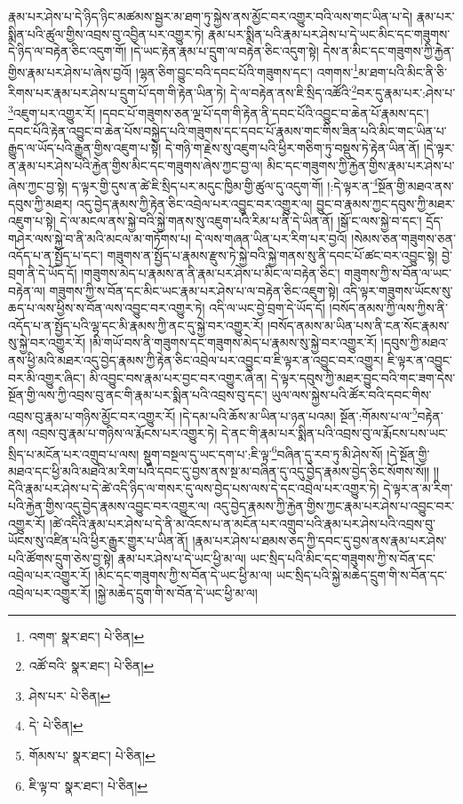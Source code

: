 རྣམ་པར་ཤེས་པ་དེ་ཉིད་ཉིང་མཚམས་སྦྱར་མ་ཐག་ཏུ་སྐྱེས་ནས་མྱོང་བར་འགྱུར་བའི་ལས་གང་ཡིན་པ་དེ། རྣམ་པར་སྨིན་པའི་ཚུལ་གྱིས་འབྲས་བུ་འབྱིན་པར་འགྱུར་ཏེ། རྣམ་པར་སྨིན་པའི་རྣམ་པར་ཤེས་པ་དེ་ཡང་མིང་དང་གཟུགས་དེ་ཉིད་ལ་བརྟེན་ཅིང་འདུག་གོ། །དེ་ཡང་རྟེན་རྣམ་པ་དྲུག་ལ་བརྟེན་ཅིང་འདུག་སྟེ། དེས་ན་མིང་དང་གཟུགས་ཀྱི་རྐྱེན་གྱིས་རྣམ་པར་ཤེས་པ་ཞེས་བྱའོ། །ལྷན་ཅིག་བྱུང་བའི་དབང་པོའི་གཟུགས་དང་། འགགས་\footnote{འགག་  སྣར་ཐང་།  པེ་ཅིན། }མ་ཐག་པའི་མིང་ནི་ཅི་རིགས་པར་རྣམ་པར་ཤེས་པ་དྲུག་པོ་དག་གི་རྟེན་ཡིན་ཏེ། དེ་ལ་བརྟེན་ནས་ཇི་སྲིད་འཚོའི་\footnote{འཚོ་བའི་  སྣར་ཐང་།  པེ་ཅིན། }བར་དུ་རྣམ་པར་:ཤེས་པ་\footnote{ཤེས་པར་  པེ་ཅིན། }འཇུག་པར་འགྱུར་རོ། །དབང་པོ་གཟུགས་ཅན་ལྔ་པོ་དག་གི་རྟེན་ནི་དབང་པོའི་འབྱུང་བ་ཆེན་པོ་རྣམས་དང་། དབང་པོའི་རྟེན་འབྱུང་བ་ཆེན་པོས་བསྐྱེད་པའི་གཟུགས་དང་དབང་པོ་རྣམས་གང་གིས་ཟིན་པའི་མིང་གང་ཡིན་པ་རྒྱུད་ལ་ཡོད་པའི་རྒྱུན་གྱིས་འཇུག་པ་སྟེ། དེ་གཉི་ག་རྗེས་སུ་འཇུག་པའི་ཕྱིར་གཅིག་ཏུ་བསྡུས་ཏེ་རྟེན་ཡིན་ནོ། །དེ་ལྟར་ན་རྣམ་པར་ཤེས་པའི་རྐྱེན་གྱིས་མིང་དང་གཟུགས་ཞེས་ཀྱང་བྱ་ལ། མིང་དང་གཟུགས་ཀྱི་རྐྱེན་གྱིས་རྣམ་པར་ཤེས་པ་ཞེས་ཀྱང་བྱ་སྟེ། ད་ལྟར་གྱི་དུས་ན་ཚེ་ཇི་སྲིད་པར་མདུང་ཁྱིམ་གྱི་ཚུལ་དུ་འདུག་གོ། །:དེ་ལྟར་ན་\footnote{དེ་  པེ་ཅིན། }སྔོན་གྱི་མཐའ་ནས་དབུས་ཀྱི་མཐར། འདུ་བྱེད་རྣམས་ཀྱི་རྟེན་ཅིང་འབྲེལ་པར་འབྱུང་བར་འགྱུར་ལ། བྱུང་བ་རྣམས་ཀྱང་དབུས་ཀྱི་མཐར་འཇུག་པ་སྟེ། དེ་ལ་མངལ་ནས་སྐྱེ་བའི་སྐྱེ་གནས་སུ་འཇུག་པའི་རིམ་པ་ནི་དེ་ཡིན་ནོ། །སྒོ་ང་ལས་སྐྱེ་བ་དང་། དྲོད་གཤེར་ལས་སྐྱེ་བ་ནི་མའི་མངལ་མ་གཏོགས་པ། དེ་ལས་གཞན་ཡིན་པར་རིག་པར་བྱའོ། །སེམས་ཅན་གཟུགས་ཅན་འདོད་པ་ན་སྤྱོད་པ་དང་། གཟུགས་ན་སྤྱོད་པ་རྣམས་རྫུས་ཏེ་སྐྱེ་བའི་སྐྱེ་གནས་སུ་ནི་དབང་པོ་ཚང་བར་འབྱུང་སྟེ། བྱེ་བྲག་ནི་དེ་ཡོད་དོ། །གཟུགས་མེད་པ་རྣམས་ན་ནི་རྣམ་པར་ཤེས་པ་མིང་ལ་བརྟེན་ཅིང་། གཟུགས་ཀྱི་ས་བོན་ལ་ཡང་བརྟེན་ལ། གཟུགས་ཀྱི་ས་བོན་དང་མིང་ཡང་རྣམ་པར་ཤེས་པ་ལ་བརྟེན་ཅིང་འཇུག་སྟེ། འདི་ལྟར་གཟུགས་ཡོངས་སུ་ཆད་པ་ལས་ཕྱིས་ས་བོན་ལས་འབྱུང་བར་འགྱུར་ཏེ། འདི་ལ་ཡང་བྱེ་བྲག་དེ་ཡོད་དོ། །བསོད་ནམས་ཀྱི་ལས་ཀྱིས་ནི་འདོད་པ་ན་སྤྱོད་པའི་ལྷ་དང་མི་རྣམས་ཀྱི་ནང་དུ་སྐྱེ་བར་འགྱུར་རོ། །བསོད་ནམས་མ་ཡིན་པས་ནི་ངན་སོང་རྣམས་སུ་སྐྱེ་བར་འགྱུར་རོ། །མི་གཡོ་བས་ནི་གཟུགས་དང་གཟུགས་མེད་པ་རྣམས་སུ་སྐྱེ་བར་འགྱུར་རོ། །དབུས་ཀྱི་མཐའ་ནས་ཕྱི་མའི་མཐར་འདུ་བྱེད་རྣམས་ཀྱི་རྟེན་ཅིང་འབྲེལ་པར་འབྱུང་བ་ཇི་ལྟར་ན་འབྱུང་བར་འགྱུར། ཇི་ལྟར་ན་འབྱུང་བར་མི་འགྱུར་ཞིང་། མི་འབྱུང་བས་རྣམ་པར་བྱང་བར་འགྱུར་ཞེ་ན། དེ་ལྟར་དབུས་ཀྱི་མཐར་བྱུང་བའི་གང་ཟག་དེས་སྔོན་གྱི་ལས་ཀྱི་འབྲས་བུ་ནང་གི་རྣམ་པར་སྨིན་པའི་འབྲས་བུ་དང་། ཡུལ་ལས་སྐྱེས་པའི་ཚོར་བའི་དབང་གིས་འབྲས་བུ་རྣམ་པ་གཉིས་མྱོང་བར་འགྱུར་རོ། །དེ་དམ་པའི་ཆོས་མ་ཡིན་པ་ཉན་པའམ། སྔོན་:གོམས་པ་ལ་\footnote{གོམས་པ་  སྣར་ཐང་།  པེ་ཅིན། }བརྟེན་ནས། འབྲས་བུ་རྣམ་པ་གཉིས་ལ་རྨོངས་པར་འགྱུར་ཏེ། དེ་ནང་གི་རྣམ་པར་སྨིན་པའི་འབྲས་བུ་ལ་རྨོངས་པས་ཡང་སྲིད་པ་མངོན་པར་འགྲུབ་པ་ལས། སྡུག་བསྔལ་དུ་ཡང་དག་པ་:ཇི་ལྟ་\footnote{ཇི་ལྟ་བ་  སྣར་ཐང་།  པེ་ཅིན། }བཞིན་དུ་རབ་ཏུ་མི་ཤེས་སོ། །དེ་སྔོན་གྱི་མཐའ་དང་ཕྱི་མའི་མཐའི་མ་རིག་པའི་དབང་དུ་བྱས་ནས་སྔ་མ་བཞིན་དུ་འདུ་བྱེད་རྣམས་བྱེད་ཅིང་སོགས་སོ།། །།དེའི་རྣམ་པར་ཤེས་པ་དེ་ཚེ་འདི་ཉིད་ལ་གསར་དུ་ལས་བྱེད་པས་ལས་དེ་དང་འབྲེལ་པར་འགྱུར་ཏེ། དེ་ལྟར་ན་མ་རིག་པའི་རྐྱེན་གྱིས་འདུ་བྱེད་རྣམས་འབྱུང་བར་འགྱུར་ལ། འདུ་བྱེད་རྣམས་ཀྱི་རྐྱེན་གྱིས་ཀྱང་རྣམ་པར་ཤེས་པ་འབྱུང་བར་འགྱུར་རོ། །ཚེ་འདིའི་རྣམ་པར་ཤེས་པ་དེ་ནི་མ་འོངས་པ་ན་མངོན་པར་འགྲུབ་པའི་རྣམ་པར་ཤེས་པའི་འབྲས་བུ་ཡོངས་སུ་འཛིན་པའི་ཕྱིར་རྒྱུར་གྱུར་པ་ཡིན་ནོ། །རྣམ་པར་ཤེས་པ་ཐམས་ཅད་ཀྱི་དབང་དུ་བྱས་ནས་རྣམ་པར་ཤེས་པའི་ཚོགས་དྲུག་ཅེས་བྱ་སྟེ། རྣམ་པར་ཤེས་པ་དེ་ཡང་ཕྱི་མ་ལ། ཡང་སྲིད་པའི་མིང་དང་གཟུགས་ཀྱི་ས་བོན་དང་འབྲེལ་པར་འགྱུར་རོ། །མིང་དང་གཟུགས་ཀྱི་ས་བོན་དེ་ཡང་ཕྱི་མ་ལ། ཡང་སྲིད་པའི་སྐྱེ་མཆེད་དྲུག་གི་ས་བོན་དང་འབྲེལ་པར་འགྱུར་རོ། །སྐྱེ་མཆེད་དྲུག་གི་ས་བོན་དེ་ཡང་ཕྱི་མ་ལ། 